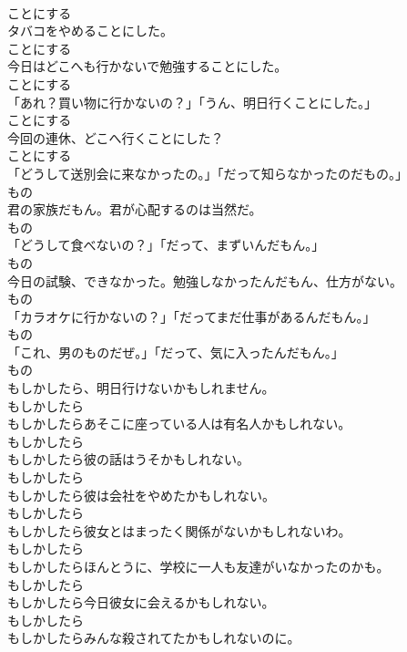 \documentclass[8pt]{extreport}
\begin{document}
\begin{CJK}{UTF8}{min}
\\	ことにする
\\	タバコをやめることにした。	
\\	ことにする
\\	今日はどこへも行かないで勉強することにした。	
\\	ことにする
\\	「あれ？買い物に行かないの？」「うん、明日行くことにした。」	
\\	ことにする
\\	今回の連休、どこへ行くことにした？	
\\	ことにする
\\	「どうして送別会に来なかったの。」「だって知らなかったのだもの。」	
\\	もの
\\	君の家族だもん。君が心配するのは当然だ。	
\\	もの
\\	「どうして食べないの？」「だって、まずいんだもん。」	
\\	もの
\\	今日の試験、できなかった。勉強しなかったんだもん、仕方がない。	
\\	もの
\\	「カラオケに行かないの？」「だってまだ仕事があるんだもん。」	
\\	もの
\\	「これ、男のものだぜ。」「だって、気に入ったんだもん。」	
\\	もの
\\	もしかしたら、明日行けないかもしれません。	
\\	もしかしたら
\\	もしかしたらあそこに座っている人は有名人かもしれない。	
\\	もしかしたら
\\	もしかしたら彼の話はうそかもしれない。	
\\	もしかしたら
\\	もしかしたら彼は会社をやめたかもしれない。	
\\	もしかしたら
\\	もしかしたら彼女とはまったく関係がないかもしれないわ。	
\\	もしかしたら
\\	もしかしたらほんとうに、学校に一人も友達がいなかったのかも。	
\\	もしかしたら
\\	もしかしたら今日彼女に会えるかもしれない。	
\\	もしかしたら
\\	もしかしたらみんな殺されてたかもしれないのに。	

\end{CJK}
\end{document}
